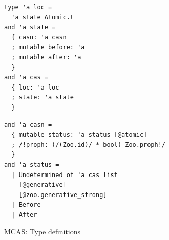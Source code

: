\begin{figure}
\begin{minipage}[t]{.45\textwidth}
\begin{lstlisting}
type 'a loc =
  'a state Atomic.t
and 'a state =
  { casn: 'a casn
  ; mutable before: 'a
  ; mutable after: 'a
  }
and 'a cas =
  { loc: 'a loc
  ; state: 'a state
  }
\end{lstlisting}
\end{minipage}
\begin{minipage}[t]{.45\textwidth}
\begin{lstlisting}
and 'a casn =
  { mutable status: 'a status [@atomic]
  ; /!proph: (/(Zoo.id)/ * bool) Zoo.proph!/
  }
and 'a status =
  | Undetermined of 'a cas list
    [@generative]
    [@zoo.generative_strong]
  | Before
  | After
\end{lstlisting}
\end{minipage}
\caption{MCAS: Type definitions}
\label{fig:mcas_types}
\end{figure}